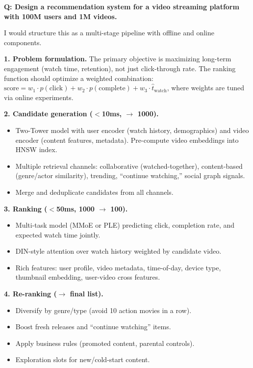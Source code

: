 \begin{interviewq}
\textbf{Q: Design a recommendation system for a video streaming platform with 100M users and 1M videos.}

 \quad {} \quad \badgefreq{\freqhigh}

\stronganswer

I would structure this as a multi-stage pipeline with offline and online components.

\textbf{1. Problem formulation.} The primary objective is maximizing long-term engagement (watch time, retention), not just click-through rate. The ranking function should optimize a weighted combination: $\text{score} = w_1 \cdot p(\text{click}) + w_2 \cdot p(\text{complete}) + w_3 \cdot \hat{t}_{\text{watch}}$, where weights are tuned via online experiments.

\textbf{2. Candidate generation ($<$10ms, $\rightarrow$ 1000).}
\begin{itemize}
    \item Two-Tower model with user encoder (watch history, demographics) and video encoder (content features, metadata). Pre-compute video embeddings into HNSW index.
    \item Multiple retrieval channels: collaborative (watched-together), content-based (genre/actor similarity), trending, ``continue watching,'' social graph signals.
    \item Merge and deduplicate candidates from all channels.
\end{itemize}

\textbf{3. Ranking ($<$50ms, 1000 $\rightarrow$ 100).}
\begin{itemize}
    \item Multi-task model (MMoE or PLE) predicting click, completion rate, and expected watch time jointly.
    \item DIN-style attention over watch history weighted by candidate video.
    \item Rich features: user profile, video metadata, time-of-day, device type, thumbnail embedding, user-video cross features.
\end{itemize}

\textbf{4. Re-ranking ($\rightarrow$ final list).}
\begin{itemize}
    \item Diversify by genre/type (avoid 10 action movies in a row).
    \item Boost fresh releases and ``continue watching'' items.
    \item Apply business rules (promoted content, parental controls).
    \item Exploration slots for new/cold-start content.
\end{itemize}


\end{interviewq}

